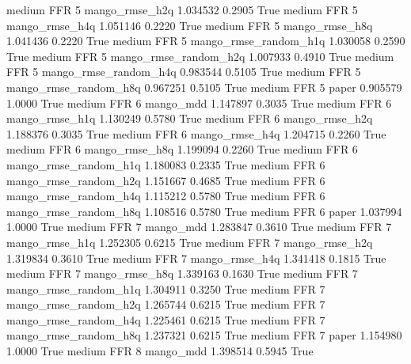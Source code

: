     medium      FFR                 5        mango_rmse_h2q   1.034532      0.2905    True
    medium      FFR                 5        mango_rmse_h4q   1.051146      0.2220    True
    medium      FFR                 5        mango_rmse_h8q   1.041436      0.2220    True
    medium      FFR                 5 mango_rmse_random_h1q   1.030058      0.2590    True
    medium      FFR                 5 mango_rmse_random_h2q   1.007933      0.4910    True
    medium      FFR                 5 mango_rmse_random_h4q   0.983544      0.5105    True
    medium      FFR                 5 mango_rmse_random_h8q   0.967251      0.5105    True
    medium      FFR                 5                 paper   0.905579      1.0000    True
    medium      FFR                 6             mango_mdd   1.147897      0.3035    True
    medium      FFR                 6        mango_rmse_h1q   1.130249      0.5780    True
    medium      FFR                 6        mango_rmse_h2q   1.188376      0.3035    True
    medium      FFR                 6        mango_rmse_h4q   1.204715      0.2260    True
    medium      FFR                 6        mango_rmse_h8q   1.199094      0.2260    True
    medium      FFR                 6 mango_rmse_random_h1q   1.180083      0.2335    True
    medium      FFR                 6 mango_rmse_random_h2q   1.151667      0.4685    True
    medium      FFR                 6 mango_rmse_random_h4q   1.115212      0.5780    True
    medium      FFR                 6 mango_rmse_random_h8q   1.108516      0.5780    True
    medium      FFR                 6                 paper   1.037994      1.0000    True
    medium      FFR                 7             mango_mdd   1.283847      0.3610    True
    medium      FFR                 7        mango_rmse_h1q   1.252305      0.6215    True
    medium      FFR                 7        mango_rmse_h2q   1.319834      0.3610    True
    medium      FFR                 7        mango_rmse_h4q   1.341418      0.1815    True
    medium      FFR                 7        mango_rmse_h8q   1.339163      0.1630    True
    medium      FFR                 7 mango_rmse_random_h1q   1.304911      0.3250    True
    medium      FFR                 7 mango_rmse_random_h2q   1.265744      0.6215    True
    medium      FFR                 7 mango_rmse_random_h4q   1.225461      0.6215    True
    medium      FFR                 7 mango_rmse_random_h8q   1.237321      0.6215    True
    medium      FFR                 7                 paper   1.154980      1.0000    True
    medium      FFR                 8             mango_mdd   1.398514      0.5945    True
